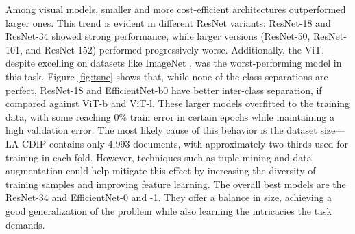 Among visual models, smaller and more cost-efficient architectures outperformed larger ones. This trend is evident in different ResNet variants: ResNet-18 and ResNet-34 showed strong performance, while larger versions (ResNet-50, ResNet-101, and ResNet-152) performed progressively worse. Additionally, the \gls{ViT}, despite excelling on datasets like ImageNet \cite{deng_imagenet_2009}, was the worst-performing model in this task. Figure \ref{fig:tsne} shows that, while none of the class separations are perfect, ResNet-18 and EfficientNet-b0 have better inter-class separation, if compared against ViT-b and ViT-l. These larger models overfitted to the training data, with some reaching 0\% train error in certain epochs while maintaining a high validation error. The most likely cause of this behavior is the dataset size—LA-CDIP contains only 4,993 documents, with approximately two-thirds used for training in each fold. However, techniques such as tuple mining and data augmentation could help mitigate this effect by increasing the diversity of training samples and improving feature learning. The overall best models are the ResNet-34 and EfficientNet-0 and -1. They offer a balance in size, achieving a good generalization of the problem while also learning the intricacies the task demands.

